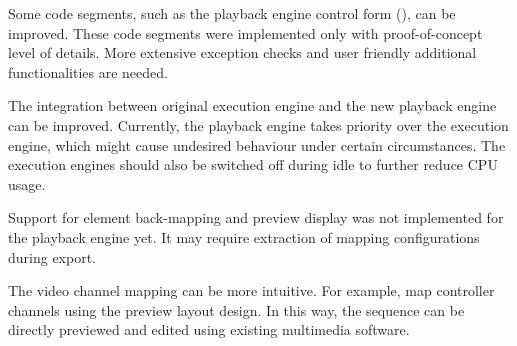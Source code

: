 Some code segments, such as the playback engine control form (), can be improved. These code segments were implemented only with proof-of-concept level of details. More extensive exception checks and user friendly additional functionalities are needed.

The integration between original execution engine and the new playback engine can be improved. Currently, the playback engine takes priority over the execution engine, which might cause undesired behaviour under certain circumstances. The execution engines should also be switched off during idle to further reduce CPU usage.

Support for element back-mapping and preview display was not implemented for the playback engine yet. It may require extraction of mapping configurations during export.

The video channel mapping can be more intuitive. For example, map controller channels using the preview layout design. In this way, the sequence can be directly previewed and edited using existing multimedia software.
